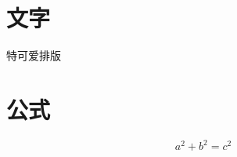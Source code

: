 \documentclass[UTF8]{ctexart}
\begin{document}
\section{文字}\label{sec:text}
特可爱排版

\section{公式}
\[
    a^2 + b^2 = c^2
\]
\end{document}
